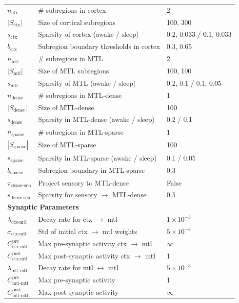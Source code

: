 \documentclass{article}
\begin{document}
\begin{table}[ht]
\begin{tabular}{lll}
$n_{\text{ctx}}$ & \# subregions in cortex & 2 \\
$|S_{\text{ctx}}|$ & Size of cortical subregions & 100, 300 \\
$s_{\text{ctx}}$ & Sparsity of cortex (awake / sleep) & 0.2, 0.033 / 0.1, 0.033 \\
$b_{\text{ctx}}$ & Subregion boundary thresholds in cortex & 0.3, 0.65 \\

$n_{\text{mtl}}$ & \# subregions in MTL & 2 \\
$|S_{\text{mtl}}|$ & Size of MTL subregions & 100, 100 \\
$s_{\text{mtl}}$ & Sparsity of MTL (awake / sleep) & 0.2, 0.1 / 0.1, 0.05 \\

$n_{\text{dense}}$ & \# subregions in MTL-dense & 1 \\
$|S_{\text{dense}}|$ & Size of MTL-dense & 100 \\
$s_{\text{dense}}$ & Sparsity in MTL-dense (awake / sleep) & 0.2 / 0.1 \\

$n_{\text{sparse}}$ & \# subregions in MTL-sparse & 1 \\
$|S_{\text{sparse}}|$ & Size of MTL-sparse & 100 \\
$s_{\text{sparse}}$ & Sparsity in MTL-sparse (awake / sleep) & 0.1 / 0.05 \\
$b_{\text{sparse}}$ & Subregion boundary in MTL-sparse & 0.3 \\

$\pi_{\text{dense-sen}}$ & Project sensory to MTL-dense & False \\
$s_{\text{dense-sen}}$ & Sparsity for sensory $\to$ MTL-dense & 0.5 \\

\midrule
\multicolumn{3}{l}{\textbf{Synaptic Parameters}} \\
\midrule

$\lambda_{\text{ctx-mtl}}$ & Decay rate for ctx $\to$ mtl & $1 \times 10^{-3}$ \\
$\sigma_{\text{ctx-mtl}}$ & Std of initial ctx $\to$ mtl weights & $5 \times 10^{-4}$ \\
$C^{\text{pre}}_{\text{ctx-mtl}}$ & Max pre-synaptic activity ctx $\to$ mtl & $\infty$ \\
$C^{\text{post}}_{\text{ctx-mtl}}$ & Max post-synaptic activity ctx $\to$ mtl & 1 \\

$\lambda_{\text{mtl-mtl}}$ & Decay rate for mtl $\leftrightarrow$ mtl & $5 \times 10^{-3}$ \\
$C^{\text{pre}}_{\text{mtl-mtl}}$ & Max pre-synaptic activity & 1 \\
$C^{\text{post}}_{\text{mtl-mtl}}$ & Max post-synaptic activity & $\infty$ \\


\end{tabular}
\end{table}
\end{document}
